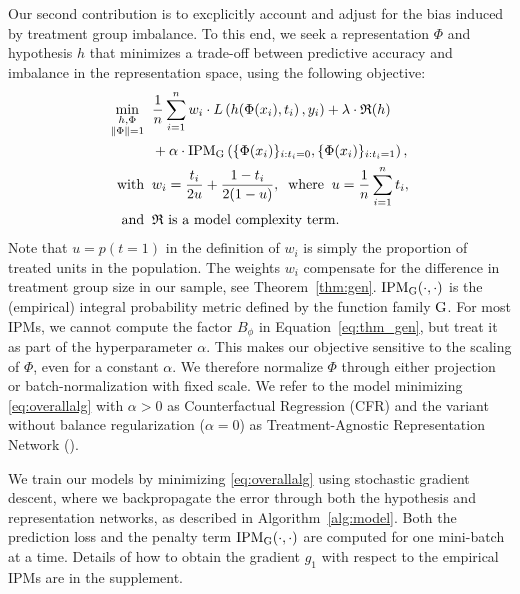 Our second contribution is to excplicitly account and adjust for the bias induced by treatment group imbalance. To this end, we seek a representation $\Phi$ and hypothesis $h$ that minimizes a trade-off between predictive accuracy and imbalance in the representation space, using the following objective:
\begin{equation}
\begin{aligned}
\min_{\substack{h, \Phi\\ \|\Phi\|=1}} & \;\; \frac 1 n \sum_{i=1}^n w_i \cdot L\left(h(\Phi(x_i),t_i)\, ,y_i\right) + \lambda \cdot \mathfrak{R}(h)  \\
& \;\; + \alpha  \cdot \text{IPM}_{\mathrm{G}}\left(\{\Phi(x_i)\}_{i:t_i=0},\{\Phi(x_i)\}_{i:t_i=1}\right), \\
\mbox{with} & \;\; w_i = \frac{t_i}{2u} + \frac{1-t_i}{2(1-u)},\;\;\mbox{where}\;\;u = \frac{1}{n}\sum_{i=1}^n t_i, \\
\mbox{and} & \;\;\mbox{$\mathfrak{R}$ is a model complexity term.}
\label{eq:overallalg}
\end{aligned}
\end{equation}
Note that $u=p(t=1)$ in the definition of $w_i$ is simply the proportion of treated units in the population. The weights $w_i$ compensate for the difference in treatment group size in our sample, see Theorem~\ref{thm:gen}. $\text{IPM}_{\mathrm{G}}(\cdot,\cdot)$ is the (empirical) integral probability metric defined by the function family $\mathrm{G}$. For most IPMs, we cannot compute the factor $B_\phi$ in Equation~\ref{eq:thm_gen}, but treat it as part of the hyperparameter $\alpha$. This makes our objective sensitive to the scaling of $\Phi$, even for a constant $\alpha$. We therefore normalize $\Phi$ through either projection or batch-normalization with fixed scale. We refer to the model minimizing \eqref{eq:overallalg} with $\alpha>0$ as Counterfactual Regression (CFR) and the variant without balance regularization ($\alpha=0$) as Treatment-Agnostic Representation Network (\tarnet{}).

We train our models by minimizing \eqref{eq:overallalg} using stochastic gradient descent, where we backpropagate the error through both the hypothesis and representation networks, as described in Algorithm~\ref{alg:model}. Both the prediction loss and the penalty term $\text{IPM}_{\mathrm{G}}(\cdot,\cdot)$ are computed for one mini-batch at a time. Details of how to obtain the gradient $g_1$ with respect to the empirical IPMs are in the supplement.

